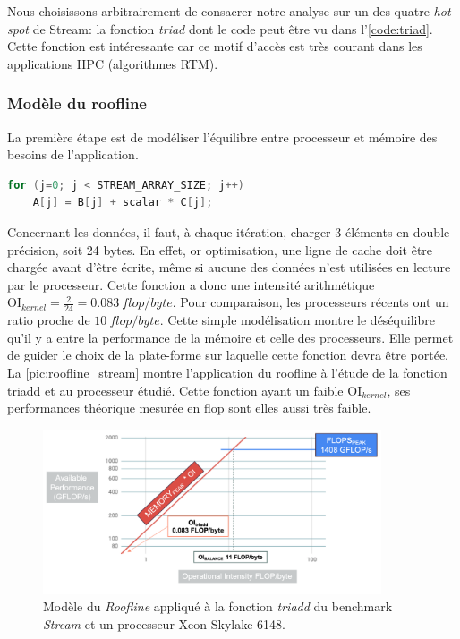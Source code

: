 Nous choisissons arbitrairement de consacrer notre analyse sur un des quatre \textit{hot spot} de Stream: la fonction \textit{triad} dont le code peut être vu dans l'\autoref{code:triad}. Cette fonction est intéressante car ce motif d'accès est très courant dans les applications HPC (algorithmes RTM).

\subsubsection{Modèle du roofline}
La première étape est de modéliser l'équilibre entre processeur et mémoire des besoins de l'application. 

\begin{lstlisting}[language=c,caption= La fonction triad du benchmark Stream utilise trois matrices: deux en lecture et une en écriture,label={code:triad}, 
  basicstyle=\footnotesize, frame=tb,
  xleftmargin=.065\textwidth, xrightmargin=.065\textwidth]
for (j=0; j < STREAM_ARRAY_SIZE; j++)
    A[j] = B[j] + scalar * C[j];
\end{lstlisting}


Concernant les données, il faut, à chaque itération, charger 3 éléments en double précision, soit 24 bytes. En effet, or optimisation, une ligne de cache doit être chargée avant d'être écrite, même si aucune des données n'est utilisées en lecture par le processeur. Cette fonction a donc une intensité arithmétique $\text{OI}_{kernel} = \frac{2}{24} = 0.083\ flop/byte$.
Pour comparaison, les processeurs récents ont un ratio proche de $10\ flop/byte$. Cette simple modélisation montre le déséquilibre qu'il y a entre la performance de la mémoire et celle des processeurs. Elle permet de guider le choix de la plate-forme sur laquelle cette fonction devra être portée. La \autoref{pic:roofline_stream} montre l'application du roofline à l'étude de la fonction triadd et au processeur étudié. Cette fonction ayant un faible $\text{OI}_{kernel}$, ses performances théorique mesurée en flop sont elles aussi très faible.

\begin{figure}
    \center
    \includegraphics[width=10cm]{images/roofline_stream.png}
    \caption{\label{pic:roofline_stream} Modèle du \textit{Roofline} appliqué à la fonction \textit{triadd} du benchmark \textit{Stream} et un processeur Xeon Skylake 6148.}
\end{figure}



